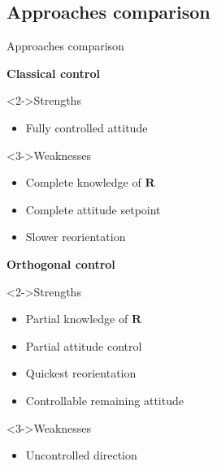 \documentclass[10pt, xcolor={usenames, dvipsnames}]{beamer}
\begin{document}
        \subsection{Approaches comparison}

            \begin{frame}{Approaches comparison}
                \begin{minipage}[t]{0.48\textwidth}
                    \centering
                    \textbf{\large Classical control}
                    \begin{block}<2->{Strengths}
                        \begin{itemize}
                            \item Fully controlled attitude
                        \end{itemize}
                    \end{block}
                    \begin{block}<3->{Weaknesses}
                        \begin{itemize}
                            \item Complete knowledge of $\mathbf{R}$
                            \item Complete attitude setpoint
                            \item Slower reorientation
                        \end{itemize}
                    \end{block}
                \end{minipage}
                \hfill
                \begin{minipage}[t]{0.48\textwidth}
                    \centering
                    \textbf{\large Orthogonal control}
                    \begin{block}<2->{Strengths}
                        \begin{itemize}
                            \item Partial knowledge of $\mathbf{R}$
                            \item Partial attitude control
                            \item Quickest reorientation
                            \item Controllable remaining attitude
                        \end{itemize}
                    \end{block}
                    \begin{block}<3->{Weaknesses}
                        \begin{itemize}
                            \item Uncontrolled direction
                        \end{itemize}
                    \end{block}
                \end{minipage}
            \end{frame}
    
\end{document}
